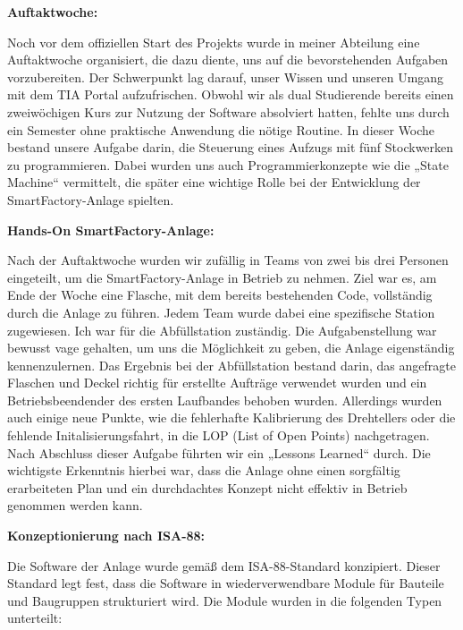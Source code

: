 \textbf{Auftaktwoche:}

Noch vor dem offiziellen Start des Projekts wurde in meiner Abteilung eine Auftaktwoche organisiert, die dazu diente, 
uns auf die bevorstehenden Aufgaben vorzubereiten. Der Schwerpunkt lag darauf, unser Wissen und unseren Umgang mit dem 
TIA Portal aufzufrischen. Obwohl wir als dual Studierende bereits einen zweiwöchigen Kurs zur Nutzung der Software 
absolviert hatten, fehlte uns durch ein Semester ohne praktische Anwendung die nötige Routine. In dieser Woche bestand 
unsere Aufgabe darin, die Steuerung eines Aufzugs mit fünf Stockwerken zu programmieren. Dabei wurden uns auch 
Programmierkonzepte wie die „State Machine“ vermittelt, die später eine wichtige Rolle bei der Entwicklung der 
SmartFactory-Anlage spielten.

\textbf{Hands-On SmartFactory-Anlage:}

Nach der Auftaktwoche wurden wir zufällig in Teams von zwei bis drei Personen eingeteilt, um die SmartFactory-Anlage 
in Betrieb zu nehmen. Ziel war es, am Ende der Woche eine Flasche, mit dem bereits bestehenden Code, vollständig durch 
die Anlage zu führen. Jedem Team wurde dabei eine spezifische Station zugewiesen. Ich war für die Abfüllstation zuständig. 
Die Aufgabenstellung war bewusst vage gehalten, um uns die Möglichkeit zu geben, die Anlage eigenständig kennenzulernen. 
Das Ergebnis bei der Abfüllstation bestand darin, das angefragte Flaschen und Deckel richtig für erstellte Aufträge 
verwendet wurden und ein Betriebsbeendender des ersten Laufbandes behoben wurden. Allerdings wurden auch einige neue Punkte, 
wie die fehlerhafte Kalibrierung des Drehtellers oder die fehlende Initalisierungsfahrt, in die LOP (List of Open Points) 
nachgetragen. Nach Abschluss dieser Aufgabe führten wir ein „Lessons Learned“ durch. Die wichtigste Erkenntnis hierbei war, 
dass die Anlage ohne einen sorgfältig erarbeiteten Plan und ein durchdachtes Konzept nicht effektiv in Betrieb 
genommen werden kann.

\textbf{Konzeptionierung nach ISA-88:}

Die Software der Anlage wurde gemäß dem ISA-88-Standard konzipiert. Dieser Standard legt fest, dass die Software in 
wiederverwendbare Module für Bauteile und Baugruppen strukturiert wird. Die Module wurden in die folgenden Typen unterteilt:

